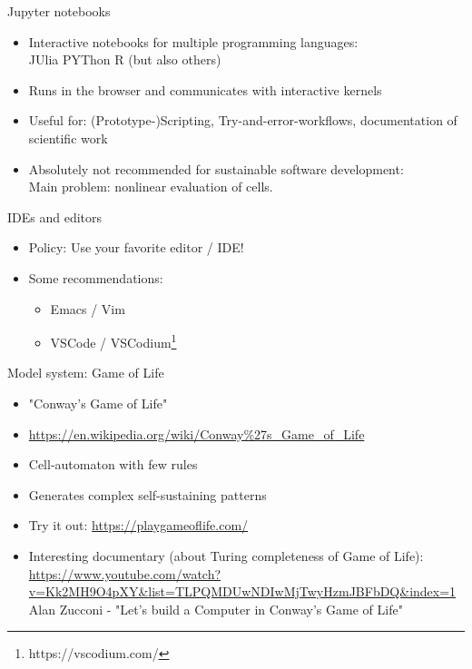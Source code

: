 \documentclass[aspectratio=169,graphics,handout]{beamer}
\begin{document}
\begin{frame}{Jupyter notebooks}

    \begin{itemize}
        \item Interactive notebooks for multiple programming languages:\\
            JUlia PYThon R (but also others)
        \item Runs in the browser and communicates with interactive kernels
        \item Useful for: (Prototype-)Scripting, Try-and-error-workflows, documentation of scientific work
        \item Absolutely not recommended for sustainable software development:\\
            Main problem: nonlinear evaluation of cells.
    \end{itemize}
\end{frame}

\begin{frame}{IDEs and editors}
    \begin{itemize}
        \item Policy: Use your favorite editor / IDE!
        \item Some recommendations:
            \begin{itemize}
                \item Emacs / Vim
                \item VSCode / VSCodium\footnote{https://vscodium.com/}
            \end{itemize}
    \end{itemize}
\end{frame}

\begin{frame}{Model system: Game of Life}
    \begin{itemize}
        \item "Conway's Game of Life"
        \item {\small \url{https://en.wikipedia.org/wiki/Conway\%27s_Game_of_Life}}
        \item Cell-automaton with few rules
        \item Generates complex self-sustaining patterns
        \item Try it out: \url{https://playgameoflife.com/}
        \item Interesting documentary (about Turing completeness of Game of Life):
            {\small \url{https://www.youtube.com/watch?v=Kk2MH9O4pXY&list=TLPQMDUwNDIwMjTwyHzmJBFbDQ&index=1} Alan Zucconi - "Let's build a Computer in Conway's Game of Life"}
    \end{itemize}

\end{frame}
\end{document}
